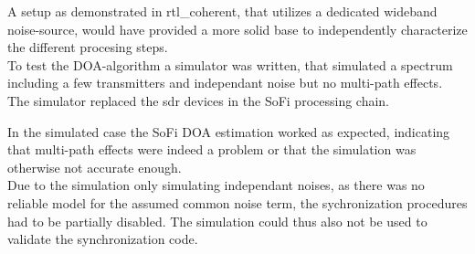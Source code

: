 A setup as demonstrated in rtl\_coherent\cite{rtlcoherent}, that
utilizes a dedicated wideband noise-source, would
have provided a more solid base to independently characterize
the different procesing steps. \\

To test the DOA-algorithm a simulator
was written, that simulated a spectrum
including a few transmitters and independant noise but no
multi-path effects.
The simulator replaced the \gls{sdr} devices in the
SoFi processing chain.

In the simulated case the SoFi DOA estimation
worked as expected, indicating that multi-path
effects were indeed a problem or that the simulation
was otherwise not accurate enough. \\

Due to the simulation only simulating independant
noises, as there was no reliable model for the
assumed common noise term, the sychronization
procedures had to be partially disabled.
The simulation could thus also not be used
to validate the synchronization code. \\
